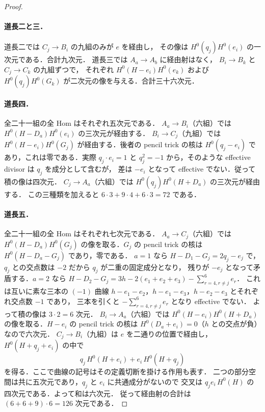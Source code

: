 \begin{proof}
\paragraph{道長二と三．}
道長二では $C_j\to B_i$ の九組のみが $e$ を経由し，
その像は $H^0(q_j)H^0(e_i)$ の一次元である．合計九次元．
道長三では $A_a\to A_b$ に経由射はなく，
$B_i\to B_k$ と $C_j\to C_k$ の九組ずつで，
それぞれ $H^0(H-e_i)H^0(e_k)$ および
$H^0(q_j)H^0(G_k)$ が二次元の像を与える．合計三十六次元．

\paragraph{道長四．}
全二十一組の全 Hom はそれぞれ五次元である．
$A_a\to B_i$（六組）では $H^0(H-D_a)H^0(e_i)$ の三次元が経由する．
$B_i\to C_j$（九組）では
$H^0(H-e_i)H^0(G_j)$ が経由する．後者の pencil trick の核は
$H^0(q_j-e_i)$ であり，これは零である．実際 $q_j\cdot e_i=1$ と
$q_j^2=-1$ から，そのような effective divisor は $q_j$ を成分として含むが，
差は $-e_i$ となって effective でない．従って積の像は四次元．
$C_j\to A_a$（六組）では $H^0(q_j)H^0(H+D_a)$ の三次元が経由する．
この三種類を加えると $6\cdot3+9\cdot4+6\cdot3=72$ である．

\paragraph{道長五．}
全二十一組の全 Hom はそれぞれ七次元である．
$A_a\to C_j$（六組）では
$H^0(H-D_a)H^0(G_j)$ の像を取る．$G_j$ の pencil trick の核は
$H^0(H-D_a-G_j)$ であり，零である．
$a=1$ なら $H-D_1-G_j=2q_j-e_j$ で，
$q_j$ との交点数は $-2$ だから $q_j$ が二重の固定成分となり，
残りが $-e_j$ となって矛盾する．$a=2$ なら
$H-D_2-G_j=3h-2(e_1+e_2+e_3)-\sum_{r=4,r\ne j}^6e_r$．
これは互いに素な三本の $(-1)$ 曲線
$h-e_1-e_2$，$h-e_1-e_3$，$h-e_2-e_3$ とそれぞれ交点数 $-1$ であり，
三本を引くと $-\sum_{r=4,r\ne j}^6 e_r$ となり effective でない．
よって積の像は $3\cdot2=6$ 次元．
$B_i\to A_a$（六組）では
$H^0(H-e_i)H^0(H+D_a)$ の像を取る．$H-e_i$ の pencil trick の核は
$H^0(D_a+e_i)=0$（$h$ との交点が負）なので六次元．
$C_j\to B_i$（九組）は $e$ を二通りの位置で経由し，
$H^0(H+q_j+e_i)$ の中で
\[
 q_j\,H^0(H+e_i)+e_i\,H^0(H+q_j)
\]
を得る．ここで曲線の記号はその定義切断を掛ける作用も表す．
二つの部分空間は共に五次元であり，$q_j$ と $e_i$ に共通成分がないので
交叉は $q_je_i\,H^0(H)$ の四次元である．よって和は六次元．
従って経由射の合計は $(6+6+9)\cdot6=126$ 次元である．


\end{proof}
